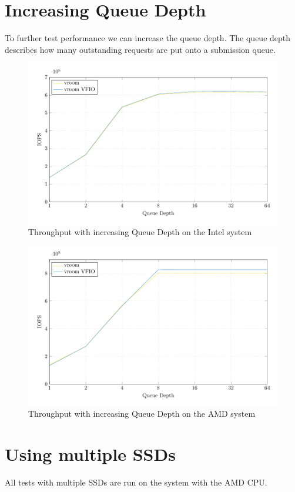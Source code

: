 \section{Increasing Queue Depth}
To further test performance we can increase the queue depth. The queue depth describes how many outstanding requests are put onto a submission queue.

\begin{figure}[H]
  \centering
  \includegraphics[width=.8\textwidth]{figures/qdnt1_2MiB}
  \caption{Throughput with increasing Queue Depth on the Intel system}
  \label{fig:qdnt1}
\end{figure}

\begin{figure}[H]
  \centering
  \includegraphics[width=.8\textwidth]{figures/qdnt1_2MiB_epyc}
  \caption{Throughput with increasing Queue Depth on the AMD system}
  \label{fig:qdnt1epyc}
\end{figure}

\section{Using multiple SSDs}
All tests with multiple SSDs are run on the system with the AMD CPU.

